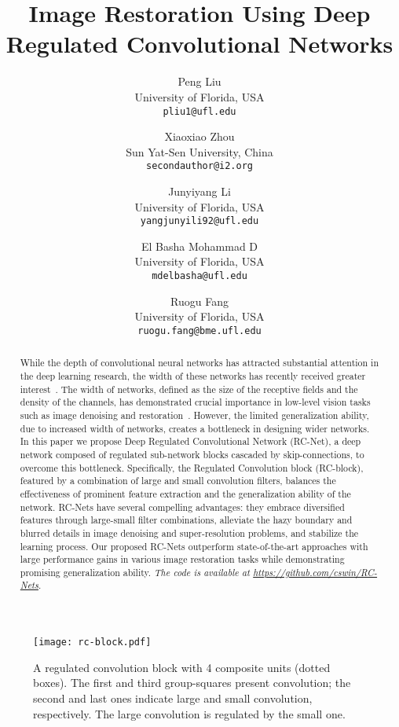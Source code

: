 \documentclass[10pt,twocolumn,letterpaper]{article}
\begin{document}
\title{Image Restoration Using Deep Regulated Convolutional Networks}

\author{Peng Liu\\
University of Florida, USA\\
{\tt\small pliu1@ufl.edu}
\and
Xiaoxiao Zhou \\
Sun Yat-Sen University, China\\
{\tt\small secondauthor@i2.org}
\and
Junyiyang Li\\
University of Florida, USA\\
{\tt\small yangjunyili92@ufl.edu}
\and
El Basha Mohammad D \\
University of Florida, USA\\
{\tt\small mdelbasha@ufl.edu}
\and
Ruogu Fang \\
University of Florida, USA\\
{\tt\small ruogu.fang@bme.ufl.edu}
}

\maketitle


\begin{abstract}
While the depth of convolutional neural networks has attracted substantial attention in the deep learning research, the width of these networks has recently received greater interest~\cite{Zagoruyko2016WideRN, lu2017expressive, DBLP:journals/corr/LiuF17}. The width of networks, defined as the size of the receptive fields and the density of the channels, has demonstrated crucial importance in low-level vision tasks such as image denoising and restoration~\cite{DBLP:journals/corr/LiuF17}. However, the limited generalization ability, due to increased width of networks, creates a bottleneck in designing wider networks. In this paper we propose Deep Regulated Convolutional Network (RC-Net), a deep network composed of regulated sub-network blocks cascaded by skip-connections, to overcome this bottleneck. Specifically, the Regulated Convolution block (RC-block), featured by a combination of large and small convolution filters, balances the effectiveness of prominent feature extraction and the  generalization ability of the network. RC-Nets have several compelling advantages: they embrace diversified features through large-small filter combinations, alleviate the hazy boundary and blurred details in image denoising and super-resolution problems, and stabilize the learning process.  Our proposed RC-Nets outperform state-of-the-art approaches with large performance gains in various image restoration tasks while demonstrating promising generalization ability. \textit{The code is available at \url{https://github.com/cswin/RC-Nets}}.
\end{abstract}
\begin{figure}[t]
\label{fig:rc-block}
  \centering
  \texttt{[image: rc-block.pdf]}
  \caption{A regulated convolution block with 4 composite units (dotted boxes). The first and third group-squares present  convolution; the second and last ones indicate large and small convolution, respectively. The large convolution is regulated by the small one. }
\end{figure}
\end{document}
